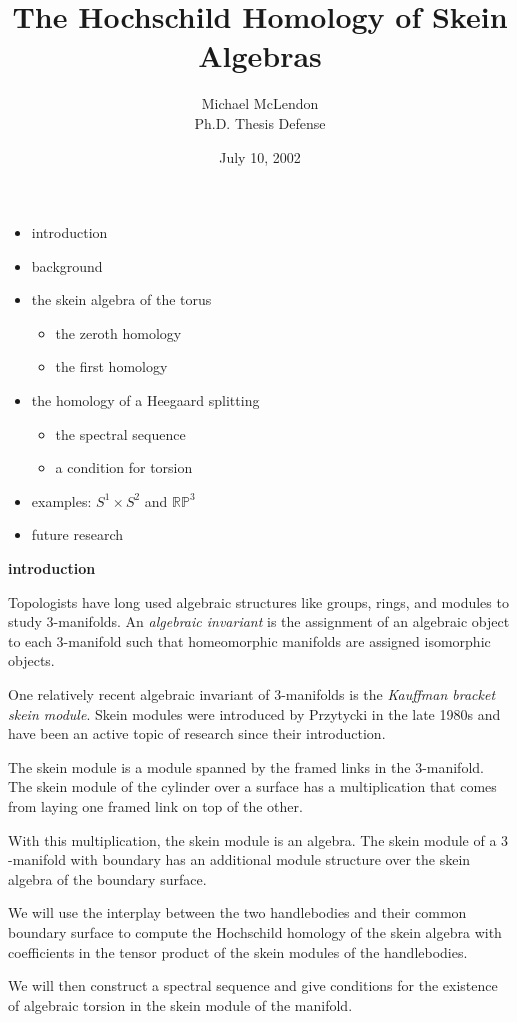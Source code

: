 \documentclass{slides}
\title{The Hochschild Homology of Skein Algebras}
\author{Michael McLendon \\ Ph.D. Thesis Defense}
\date{July 10, 2002}
\theoremstyle{definition}
\begin{document}
\maketitle

\begin{slide}
\begin{itemize}
\item introduction
\item background
\item the skein algebra of the torus
	\begin{itemize}
	\item the zeroth homology
	\item the first homology
	\end{itemize}
\item the homology of a Heegaard splitting
	\begin{itemize}
	\item the spectral sequence
	\item a condition for torsion
	\end{itemize}
\item examples:  $S^1 \times S^2$ and $\mathbb{RP}^3$
\item future research
\end{itemize}
\end{slide}

\begin{slide}

\textbf{introduction}

Topologists have long used algebraic structures like groups, rings,
and modules to study $3$-manifolds.  An \textit{algebraic invariant}
is the assignment of an algebraic object
to each $3$-manifold such that homeomorphic manifolds are assigned
isomorphic objects.

One relatively recent algebraic invariant of $3$-manifolds is the
\textit{Kauffman bracket skein module}.
Skein modules were introduced by Przytycki in the late 1980s
and have been an active topic of research since their introduction.

The skein module is a module spanned by the framed links
in the $3$-manifold.
The skein module
of the cylinder over a surface has a multiplication that
comes from laying one framed link on top of the other.
\end{slide}

\begin{slide}
With this
multiplication, the skein module is an algebra.
The skein module of a $3$-manifold with boundary
has an additional module structure over the skein algebra
of the boundary surface.

We will use the interplay between the two
handlebodies and their common boundary surface to compute
the Hochschild homology of the skein algebra with coefficients in
the tensor product of the skein modules of the handlebodies.

We will then construct a spectral sequence and give conditions for
the existence of algebraic torsion in the skein module
of the manifold.
\end{slide}
\end{document}
